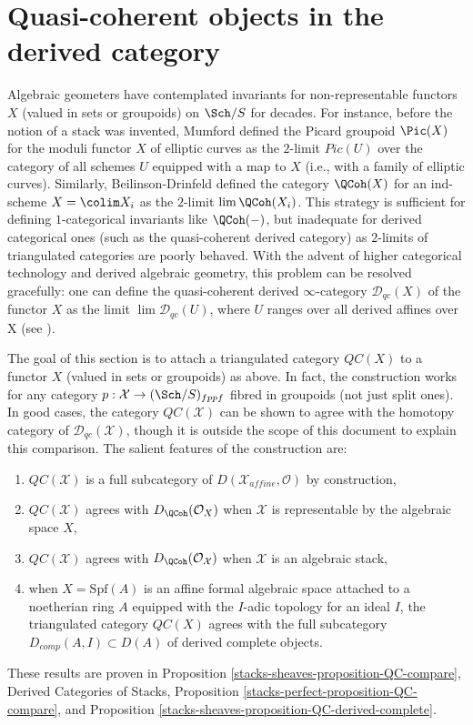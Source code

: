 \section{Quasi-coherent objects in the derived category}
\label{stacks-sheaves-section-QC}
Algebraic geometers have contemplated invariants for non-representable
functors $X$ (valued in sets or groupoids) on $\Sch/S$ for decades.
For instance,
before the notion of a stack was invented, Mumford defined \cite{mumford_picard}
the Picard groupoid $\Pic(X)$ for the moduli functor $X$ of elliptic curves
as the $2$-limit $Pic(U)$ over the category of all schemes $U$
equipped with a map to $X$ (i.e., with a family of elliptic curves).
Similarly, Beilinson-Drinfeld defined \cite{BVGD} the category
$\QCoh(X)$ for an ind-scheme $X = \colim X_i$ as the $2$-limit
$\lim \QCoh(X_i)$.
This strategy is sufficient for defining $1$-categorical invariants
like $\QCoh(-)$, but inadequate for derived categorical ones
(such as the quasi-coherent derived category) as $2$-limits
of triangulated categories are poorly behaved.
With the advent of higher categorical technology
and derived algebraic geometry, this problem can be
resolved gracefully: one can define the quasi-coherent
derived $\infty$-category $\mathcal{D}_{qc}(X)$ of the functor $X$
as the limit $\lim \mathcal{D}_{qc}(U)$, where $U$
ranges over all derived affines over X (see \cite{lurie-thesis}).

\medskip\noindent
The goal of this section is to attach a triangulated category
$\mathit{QC}(X)$ to a functor $X$ (valued in sets or groupoids)
as above. In fact, the construction works for any category
$p : \mathcal{X} \to (\Sch/S)_{fppf}$ fibred in groupoids
(not just split ones). In good cases, the category $\mathit{QC}(\mathcal{X})$
can be shown to agree with the homotopy category of
$\mathcal{D}_{qc}(\mathcal{X})$,
though it is outside the scope of this document to explain this comparison.
The salient features of the construction are:
\begin{enumerate}
\item[(a)] $\mathit{QC}(\mathcal{X})$ is a full subcategory of
$D(\mathcal{X}_{affine}, \mathcal{O})$ by construction,
\item[(b)] $\mathit{QC}(\mathcal{X})$ agrees with $D_\QCoh(\mathcal{O}_X)$
when $\mathcal{X}$ is representable by the algebraic space $X$,
\item[(c)] $\mathit{QC}(\mathcal{X})$ agrees with
$D_\QCoh(\mathcal{O}_\mathcal{X})$ when $\mathcal{X}$ is an algebraic stack,
\item[(d)] when $X = \text{Spf}(A)$ is an affine formal algebraic space
attached to a noetherian ring $A$ equipped with the $I$-adic topology
for an ideal $I$, the triangulated category
$\mathit{QC}(X)$ agrees with the full subcategory
$D_{comp}(A, I) \subset D(A)$ of derived complete objects.
\end{enumerate}
These results are proven in
Proposition \ref{stacks-sheaves-proposition-QC-compare},
Derived Categories of Stacks, Proposition
\ref{stacks-perfect-proposition-QC-compare}, and
Proposition \ref{stacks-sheaves-proposition-QC-derived-complete}.

